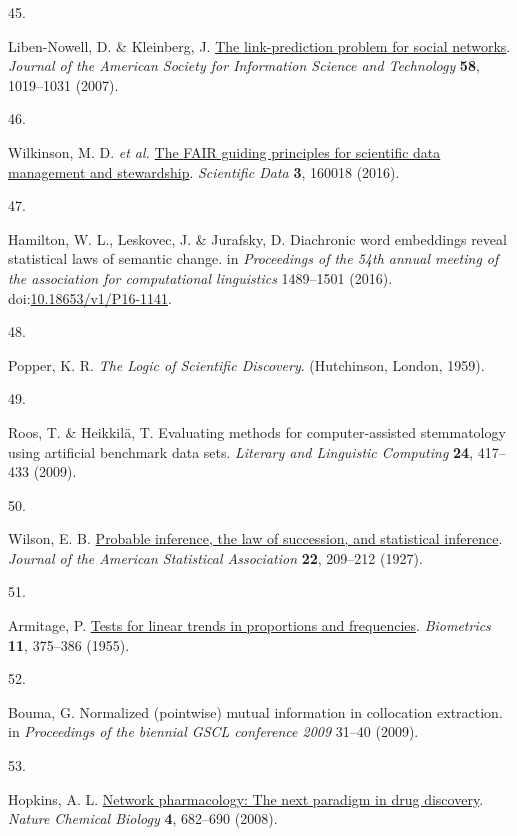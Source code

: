 \documentclass[
]{article}
\newlength{\cslhangindent}
\newlength{\csllabelwidth}
\newlength{\cslentryspacingunit} %
\newenvironment{CSLReferences}[2] %
 {%
  \setlength{\parindent}{0pt}
  \ifodd #1
  \let\oldpar\par
  \def\par{\hangindent=\cslhangindent\oldpar}
  \fi
  \setlength{\parskip}{#2\cslentryspacingunit}
 }%
 {}
\newcommand{\CSLLeftMargin}[1]{\parbox[t]{\csllabelwidth}{#1}}
\newcommand{\CSLRightInline}[1]{\parbox[t]{\linewidth - \csllabelwidth}{#1}\break}
\begin{document}
\begin{CSLReferences}{0}{0}
\leavevmode{}%
\CSLLeftMargin{45. }%
\CSLRightInline{Liben-Nowell, D. \& Kleinberg, J.
\href{https://doi.org/10.1002/asi.20591}{The link-prediction problem for
social networks}. \emph{Journal of the American Society for Information
Science and Technology} \textbf{58}, 1019--1031 (2007).}

\leavevmode{}%
\CSLLeftMargin{46. }%
\CSLRightInline{Wilkinson, M. D. \emph{et al.}
\href{https://doi.org/10.1038/sdata.2016.18}{The {FAIR} guiding
principles for scientific data management and stewardship}.
\emph{Scientific Data} \textbf{3}, 160018 (2016).}

\leavevmode{}%
\CSLLeftMargin{47. }%
\CSLRightInline{Hamilton, W. L., Leskovec, J. \& Jurafsky, D. Diachronic
word embeddings reveal statistical laws of semantic change. in
\emph{Proceedings of the 54th annual meeting of the association for
computational linguistics} 1489--1501 (2016).
doi:\href{https://doi.org/10.18653/v1/P16-1141}{10.18653/v1/P16-1141}.}

\leavevmode{}%
\CSLLeftMargin{48. }%
\CSLRightInline{Popper, K. R. \emph{The Logic of Scientific Discovery}.
(Hutchinson, London, 1959).}

\leavevmode{}%
\CSLLeftMargin{49. }%
\CSLRightInline{Roos, T. \& Heikkilä, T. Evaluating methods for
computer-assisted stemmatology using artificial benchmark data sets.
\emph{Literary and Linguistic Computing} \textbf{24}, 417--433 (2009).}

\leavevmode{}%
\CSLLeftMargin{50. }%
\CSLRightInline{Wilson, E. B.
\href{https://doi.org/10.1080/01621459.1927.10502953}{Probable
inference, the law of succession, and statistical inference}.
\emph{Journal of the American Statistical Association} \textbf{22},
209--212 (1927).}

\leavevmode{}%
\CSLLeftMargin{51. }%
\CSLRightInline{Armitage, P.
\href{https://doi.org/10.2307/3001775}{Tests for linear trends in
proportions and frequencies}. \emph{Biometrics} \textbf{11}, 375--386
(1955).}

\leavevmode{}%
\CSLLeftMargin{52. }%
\CSLRightInline{Bouma, G. Normalized (pointwise) mutual information in
collocation extraction. in \emph{Proceedings of the biennial GSCL
conference 2009} 31--40 (2009).}

\leavevmode{}%
\CSLLeftMargin{53. }%
\CSLRightInline{Hopkins, A. L.
\href{https://doi.org/10.1038/nchembio.118}{Network pharmacology: The
next paradigm in drug discovery}. \emph{Nature Chemical Biology}
\textbf{4}, 682--690 (2008).}

\end{CSLReferences}
\end{document}
